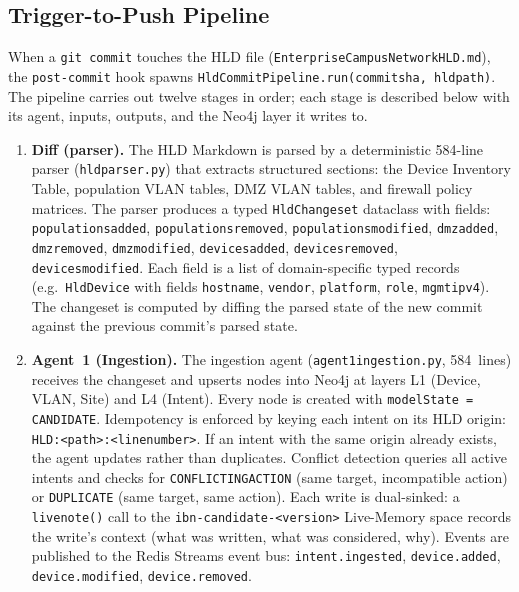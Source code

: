 \documentclass[acmtog]{acmart}
\renewcommand\_{\textunderscore\allowbreak}
\begin{document}
\subsection{Trigger-to-Push Pipeline}\label{sec:cl:pipeline}

When a \texttt{git commit} touches the HLD file
(\texttt{Enterprise\_Campus\_\allowbreak{}Network\_HLD.md}), the \texttt{post-commit}
hook spawns \texttt{HldCommit\-Pipeline.run(\allowbreak commit\_sha,\allowbreak{} hld\_path)}.
The pipeline carries out twelve stages in order; each stage is
described below with its agent, inputs, outputs, and the Neo4j layer
it writes to.

\begin{enumerate}[label=\textbf{Stage~\arabic*.},leftmargin=3em]
  \item \textbf{Diff (parser).}
    The HLD Markdown is parsed by a deterministic 584-line parser
    (\texttt{hld\_parser.py}) that extracts structured sections:
    the Device Inventory Table, population VLAN tables, DMZ VLAN
    tables, and firewall policy matrices. The parser produces a
    typed \texttt{HldChangeset} dataclass with fields:
    \texttt{populations\_added}, \texttt{populations\_removed},
    \texttt{populations\_modified}, \texttt{dmz\_added},
    \texttt{dmz\_removed}, \texttt{dmz\_modified},
    \texttt{devices\_added}, \texttt{devices\_removed},
    \texttt{devices\_modified}. Each field is a list of
    domain-specific typed records (e.g.\ \texttt{HldDevice} with
    fields \texttt{hostname}, \texttt{vendor}, \texttt{platform},
    \texttt{role}, \texttt{mgmt\_ipv4}). The changeset is
    computed by diffing the parsed state of the new commit against
    the previous commit's parsed state.

  \item \textbf{Agent~1 (Ingestion).}
    The ingestion agent (\texttt{agent1\_ingestion.py}, 584~lines)
    receives the changeset and upserts nodes into Neo4j at layers
    L1 (Device, VLAN, Site) and L4 (Intent). Every node is created
    with \texttt{modelState = CANDIDATE}. Idempotency is enforced
    by keying each intent on its HLD origin:
    \texttt{HLD:<path>:<line\_number>}. If an intent with the same
    origin already exists, the agent updates rather than duplicates.
    Conflict detection queries all active intents and checks for
    \texttt{CONFLICTING\_ACTION} (same target, incompatible action)
    or \texttt{DUPLICATE} (same target, same action). Each write
    is dual-sinked: a \texttt{live\_note()} call to the
    \texttt{ibn-candidate-<version>} Live-Memory space records the
    write's context (what was written, what was considered, why).
    Events are published to the Redis Streams event bus:
    \texttt{intent.ingested}, \texttt{device.added},
    \texttt{device.modified}, \texttt{device.removed}.


\end{enumerate}
\end{document}
